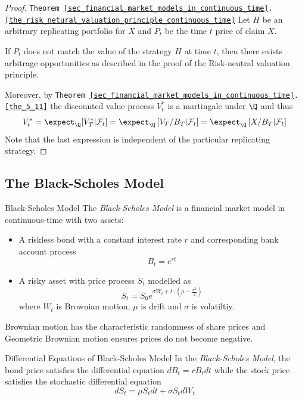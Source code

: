 \documentclass[11pt,a4paper]{article}
\begin{document}
  \begin{proof}{\texttt{Theorem \ref{sec_financial_market_models_in_continuous_time}.\ref{the_risk_netural_valuation_principle_continuous_time}}}
    Let $H$ be an arbitrary replicating portfolio for $X$ and $P_t$ be the time $t$ price of claim $X$.
    \par If $P_t$ does not match the value of the strategy $H$ at time $t$, then there exists arbitrage opportunities as described in the proof of the Risk-neutral valuation principle.
    \par Moreover, by \texttt{Theorem \ref{sec_financial_market_models_in_continuous_time}.\ref{the_5_11}} the discounted value process $V_t^*$ is a martingale under $\Q$ and thus
    \[ V_t^*=\expect_\Q[V_T^*|\mathcal{F}_t]=\expect_\Q\left[V_T/B_T|\mathcal{F}_t\right]=\expect_\Q\left[X/B_T|\mathcal{F}_t\right] \]
    Note that the last expression is independent of the particular replicating strategy.\proved
  \end{proof}

\subsection{The Black-Scholes Model}

  \begin{definition}{Black-Scholes Model}
    The \textit{Black-Scholes Model} is a financial market model in continuous-time with two assets:
    \begin{itemize}
      \item A riskless bond with a constant interest rate $r$ and corresponding bank account process
      \[ B_t=e^{rt} \]
      \item A risky asset with price process $S_t$ modelled as
      \[ S_t=S_0e^{\sigma W_t+t\cdot\left(\mu-\frac{\sigma^2}2\right)} \]
      where $W_t$ is Brownian motion, $\mu$ is drift and $\sigma$ is volatiltiy.
    \end{itemize}
    Brownian motion has the characteristic randomness of share prices and Geometric Brownian motion ensures prices do not become negative.
  \end{definition}

  \begin{proposition}{Differential Equations of Black-Scholes Model}\label{prop_diff_equations_of_black_scholes_model}
    In the \textit{Black-Scholes Model}, the bond price satisfies the differential equation $dB_t=rB_tdt$ while the stock price satisfies the stochastic differential equation
    \[ dS_t=\mu S_tdt+\sigma S_tdW_t \]
  \end{proposition}
\end{document}
